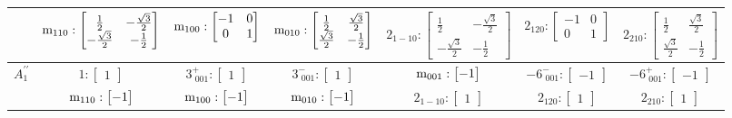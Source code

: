 \documentclass[fleqn,8pt,landscape]{jsarticle}
\begin{document}
\begin{longtable}{ccccccc}
& $ {\rm m}_{110}:\begin{bmatrix} \frac{1}{2} & - \frac{\sqrt{3}}{2} \\ - \frac{\sqrt{3}}{2} & - \frac{1}{2} \end{bmatrix} $ & $ {\rm m}_{100}:\begin{bmatrix} -1 & 0 \\ 0 & 1 \end{bmatrix} $ & $ {\rm m}_{010}:\begin{bmatrix} \frac{1}{2} & \frac{\sqrt{3}}{2} \\ \frac{\sqrt{3}}{2} & - \frac{1}{2} \end{bmatrix} $ & $ 2{}_{1-10}:\begin{bmatrix} \frac{1}{2} & - \frac{\sqrt{3}}{2} \\ - \frac{\sqrt{3}}{2} & - \frac{1}{2} \end{bmatrix} $ & $ 2{}_{120}:\begin{bmatrix} -1 & 0 \\ 0 & 1 \end{bmatrix} $ & $ 2{}_{210}:\begin{bmatrix} \frac{1}{2} & \frac{\sqrt{3}}{2} \\ \frac{\sqrt{3}}{2} & - \frac{1}{2} \end{bmatrix} $ \\ \hline
$ A_{1}^{\prime\prime} $ & $ 1:\begin{bmatrix} 1 \end{bmatrix} $ & $ 3^{+}_{\,\,001}:\begin{bmatrix} 1 \end{bmatrix} $ & $ 3^{-}_{\,\,001}:\begin{bmatrix} 1 \end{bmatrix} $ & $ {\rm m}_{001}:\begin{bmatrix} -1 \end{bmatrix} $ & $ -6^{-}_{\,\,001}:\begin{bmatrix} -1 \end{bmatrix} $ & $ -6^{+}_{\,\,001}:\begin{bmatrix} -1 \end{bmatrix} $ \\
& $ {\rm m}_{110}:\begin{bmatrix} -1 \end{bmatrix} $ & $ {\rm m}_{100}:\begin{bmatrix} -1 \end{bmatrix} $ & $ {\rm m}_{010}:\begin{bmatrix} -1 \end{bmatrix} $ & $ 2{}_{1-10}:\begin{bmatrix} 1 \end{bmatrix} $ & $ 2{}_{120}:\begin{bmatrix} 1 \end{bmatrix} $ & $ 2{}_{210}:\begin{bmatrix} 1 \end{bmatrix} $ \\ \hline

\end{longtable}
\end{document}
